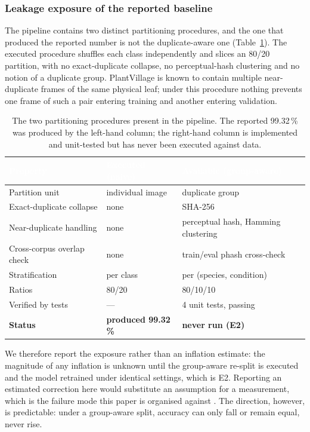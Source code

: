 \documentclass[journal]{IEEEtran}
\newcommand{\hd}[1]{\textcolor{white}{\textbf{#1}}}
\begin{document}
\subsubsection{Leakage exposure of the reported baseline}
\label{sec:leakage}

The pipeline contains two distinct partitioning procedures, and the one
that produced the reported number is not the duplicate-aware one
(Table~\ref{tab:split}). The executed procedure shuffles each class
independently and slices an 80/20 partition, with no exact-duplicate
collapse, no perceptual-hash clustering and no notion of a duplicate group.
PlantVillage is known to contain multiple near-duplicate frames of the same
physical leaf; under this procedure nothing prevents one frame of such a
pair entering training and another entering validation.

\begin{table}[t]
\centering
\caption{The two partitioning procedures present in the pipeline. The
reported 99.32\,\% was produced by the left-hand column; the right-hand
column is implemented and unit-tested but has never been executed against
data.}
\label{tab:split}
\footnotesize
\setlength{\tabcolsep}{3pt}
\begin{tabular}{p{1.75cm}p{2.55cm}p{2.85cm}}
\rowcolor{hdr}
\hd{Property} & \hd{Executed (naive)} & \hd{Available (group-aware)} \\
\midrule
\rowcolor{rowlite}
Partition unit & individual image & duplicate group \\
Exact-duplicate collapse & none & SHA-256 \\
\rowcolor{rowlite}
Near-duplicate handling & none & perceptual hash, Hamming clustering \\
Cross-corpus overlap check & none & train/eval phash cross-check \\
\rowcolor{rowlite}
Stratification & per class & per (species, condition) \\
Ratios & 80/20 & 80/10/10 \\
\rowcolor{rowlite}
Verified by tests & --- & 4 unit tests, passing \\
\rowcolor{pend}
\textbf{Status} & \textbf{produced 99.32\,\%} & \textbf{never run (E2)} \\
\bottomrule
\end{tabular}
\end{table}

We therefore report the exposure rather than an inflation estimate: the
magnitude of any inflation is unknown until the group-aware re-split is
executed and the model retrained under identical settings, which is E2.
Reporting an estimated correction here would substitute an assumption for a
measurement, which is the failure mode this paper is organised against
\cite{kapoor2023leakage}. The direction, however, is predictable: under a
group-aware split, accuracy can only fall or remain equal, never rise.
\end{document}
